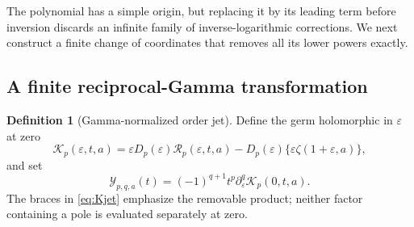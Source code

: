 \documentclass[11pt,a4paper]{article}
\numberwithin{equation}{section}
\theoremstyle{definition}
\newtheorem{definition}[theorem]{Definition}
\theoremstyle{remark}
\newcommand{\eps}{\varepsilon}
\newcommand{\cR}{\mathcal R}
\newcommand{\cY}{\mathcal Y}
\newcommand{\cK}{\mathcal K}
\begin{document}
The polynomial has a simple origin, but replacing it by its leading
term before inversion discards an infinite family of inverse-logarithmic
corrections. We next construct a finite change of coordinates that
removes all its lower powers exactly.

\subsection{A finite reciprocal-Gamma transformation}

\begin{definition}[Gamma-normalized order jet]\label{def:normalizedjet}
Define the germ holomorphic in $\eps$ at zero
\begin{equation}\label{eq:Kjet}
 \cK_p(\eps,t,a)=\eps D_p(\eps)\cR_p(\eps,t,a)
              -D_p(\eps)\{\eps\zeta(1+\eps,a)\},
\end{equation}
and set
\begin{equation}\label{eq:Yjet}
 \cY_{p,q,a}(t)=(-1)^{q+1}t^p
    \partial_\eps^q\cK_p(0,t,a).
\end{equation}
The braces in \eqref{eq:Kjet} emphasize the removable product; neither
factor containing a pole is evaluated separately at zero.
\end{definition}
\end{document}

